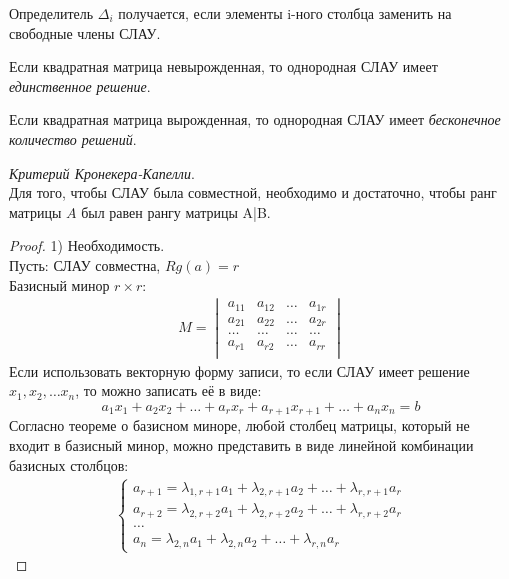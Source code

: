 \begin{note}
  Определитель $\Delta_i$ получается, если элементы i-ного столбца заменить на свободные члены СЛАУ.
\end{note}

Если квадратная матрица невырожденная, то однородная СЛАУ имеет \textit{единственное решение}. 

Если квадратная матрица вырожденная, то однородная СЛАУ имеет \textit{бесконечное количество решений}. 

\begin{theorem}
  \textit{Критерий Кронекера-Капелли}. \\
  Для того, чтобы СЛАУ была совместной, необходимо и достаточно, чтобы ранг матрицы $A$ был равен рангу матрицы A|B.
\end{theorem}
\begin{proof}
  1) Необходимость. \\
  Пусть: СЛАУ совместна, $Rg(a) = r$\\
  Базисный минор  $r \times r$:
  \begin{gather*}
    M =
    \begin{vmatrix} 
      a_{11} & a_{12} & \ldots & a_{1r} \\ 
      a_{21} & a_{22} & \ldots & a_{2r} \\ 
      \ldots & \ldots & \ldots & \ldots \\
      a_{r1} & a_{r2} & \ldots & a_{rr} \\ 
    \end{vmatrix} 
  \end{gather*}
  Если использовать векторную форму записи, то если СЛАУ имеет решение $x_1, x_2, \ldots x_{n}$, то можно записать её в виде: \[
      a_1x_1 + a_2x_2 + \ldots + a_r x_r + a_{r+1} x_{r+1} + \ldots + a_{n} x_{n} = b \tag{1}
  \]
  Согласно теореме о базисном миноре, любой столбец матрицы, который не входит в базисный минор, можно представить в виде линейной комбинации базисных столбцов:
  \begin{gather*}
    \begin{cases}
      a_{r+1} = \lambda_{1,r+1} a_1 + \lambda_{2,r+1} a_2 + \ldots + \lambda_{r,r+1} a_r \\
      a_{r+2} = \lambda_{2,r+2} a_1 + \lambda_{2,r+2} a_2 + \ldots + \lambda_{r,r+2} a_r \\
      \ldots \\
      a_{n} = \lambda_{2,n} a_1 + \lambda_{2,n} a_2 + \ldots + \lambda_{r,n} a_r
    \end{cases} \tag{2} 

\end{gather*}
\end{proof}
